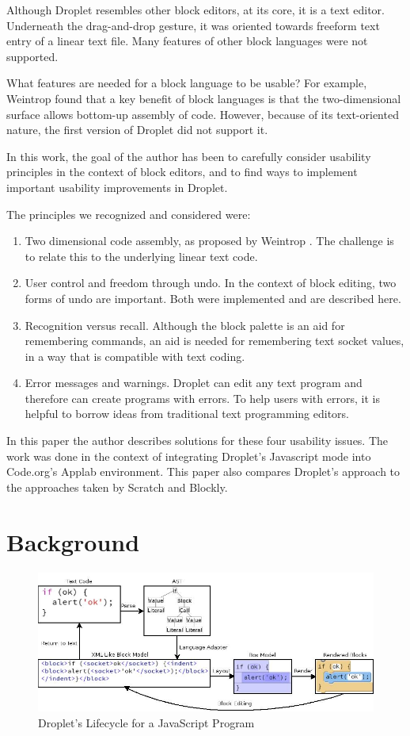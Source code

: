 \documentclass[conference]{IEEEtran}
\begin{document}
  Although Droplet resembles other block editors, at its core, it is a text editor. Underneath the drag-and-drop gesture, it was oriented towards freeform text entry of a linear text file.  Many features of other block languages were not supported.

  What features are needed for a block language to be usable? For example, Weintrop \cite{Weintrop} found that a key benefit of block languages is that the two-dimensional surface allows bottom-up assembly of code. However, because of its text-oriented nature, the first version of Droplet did not support it.

  In this work, the goal of the author has been to carefully consider usability principles in the context of block editors, and to find ways to implement important usability improvements in Droplet.

  The principles we recognized and considered were:

\begin{enumerate}
  \item Two dimensional code assembly, as proposed by Weintrop \cite{Weintrop}. The challenge is to relate this to the underlying linear text code.
  \item User control and freedom through undo. In the context of block editing, two forms of undo are important.  Both were implemented and are described here.
  \item Recognition versus recall.  Although the block palette is an aid for remembering commands, an aid is needed for remembering text socket values, in a way that is compatible with text coding.
  \item Error messages and warnings. Droplet can edit any text program and therefore can create programs with errors. To help users with errors, it is helpful to borrow ideas from traditional text programming editors.
\end{enumerate}

  In this paper the author describes solutions for these four usability issues. The work was done in the context of integrating Droplet's Javascript mode into Code.org's Applab environment. This paper also compares Droplet's approach to the approaches taken by Scratch and Blockly.
\section{Background}
\begin{figure}
\centering
\includegraphics[width=5in]{lifecycle.jpg}
\caption{Droplet's Lifecycle for a JavaScript Program}
\label{lifecycle}
\end{figure}
\end{document}
